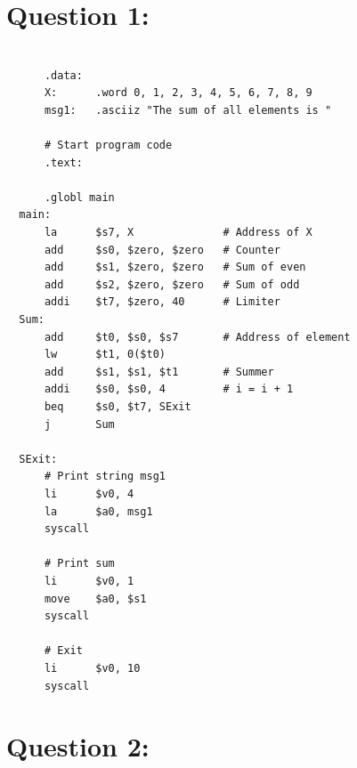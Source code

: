 \documentclass[12pt,a4paper]{article}
\begin{document}
\begin{titlepage}
\begin{center}
\begin{minipage}{0.4\textwidth}
\begin{flushright}
      \end{flushright}
    \end{minipage}

    \vfill

    \vspace{2cm}
    {\large} %
  \end{center}
\end{titlepage}


\section*{Question 1:}

\begin{mdframed}[hidealllines=true,backgroundcolor=magenta!10]
  \begin{lstlisting}

      .data:
      X:      .word 0, 1, 2, 3, 4, 5, 6, 7, 8, 9
      msg1:   .asciiz "The sum of all elements is "

      # Start program code
      .text:

      .globl main
  main:
      la      $s7, X              # Address of X
      add     $s0, $zero, $zero   # Counter
      add     $s1, $zero, $zero   # Sum of even
      add     $s2, $zero, $zero   # Sum of odd
      addi    $t7, $zero, 40      # Limiter
  Sum:
      add     $t0, $s0, $s7       # Address of element
      lw      $t1, 0($t0)
      add     $s1, $s1, $t1       # Summer
      addi    $s0, $s0, 4         # i = i + 1
      beq     $s0, $t7, SExit
      j       Sum

  SExit:
      # Print string msg1
      li      $v0, 4
      la      $a0, msg1
      syscall

      # Print sum
      li      $v0, 1
      move    $a0, $s1
      syscall

      # Exit
      li      $v0, 10
      syscall

          \end{lstlisting}
\end{mdframed}

\section*{Question 2:}
\end{document}
